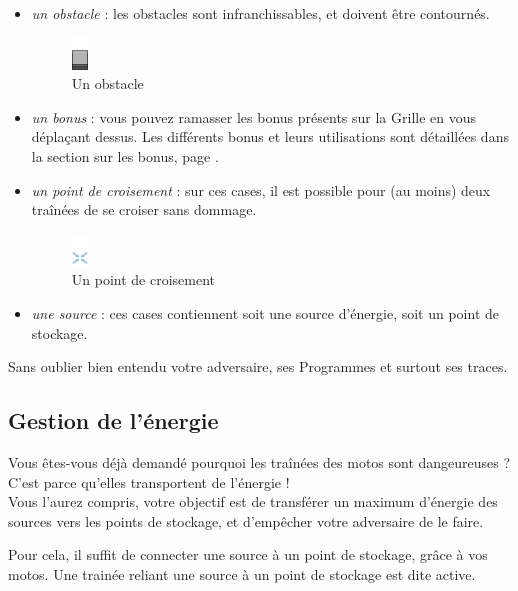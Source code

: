 \begin{itemize}
  \item \emph{un obstacle} : les obstacles sont infranchissables,
    et doivent être contournés.
    \begin{figure}[!h]
    \centering
    \includegraphics{../data/graphics/terrain-obstacle.png}
    \caption{Un obstacle}
    \end{figure}

  \item \emph{un bonus} : vous pouvez ramasser les bonus présents
    sur la Grille en vous déplaçant dessus. Les différents bonus et
    leurs utilisations sont détaillées dans la section sur les
    bonus, page \pageref{section-bonus}.
  \item \emph{un point de croisement} : sur ces cases, il est
    possible pour (au moins) deux traînées de se croiser sans dommage.
    \begin{figure}[!h]
    \centering
    \includegraphics{../data/graphics/terrain-point_croisement.png}
    \caption{Un point de croisement}
    \end{figure}
  \item \emph{une source} : ces cases contiennent soit une
    source d'énergie, soit un point de stockage.
\end{itemize}

Sans oublier bien entendu votre adversaire, ses Programmes et surtout
ses traces.\\

\subsection{Gestion de l'énergie}
Vous êtes-vous déjà demandé pourquoi les traînées des motos sont
dangeureuses ? C'est parce qu'elles transportent de l'énergie !\\

Vous l'aurez compris, votre objectif est de transférer un maximum
d'énergie des sources vers les points de stockage, et d'empêcher votre
adversaire de le faire.

Pour cela, il suffit de connecter une source à un point de stockage,
grâce à vos motos. Une trainée reliant une source à un point de
stockage est dite active.\\

